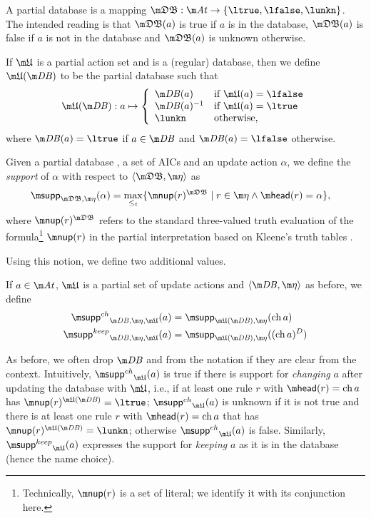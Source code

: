 A partial database is a mapping $\tdb: \atoms \to \{\ltrue,\lfalse,\lunkn\}$.
The intended reading is that $\tdb(a)$ is true if $a$ is in the database, $\tdb(a)$ is false if $a$ is not in the database and $\tdb(a)$ is unknown otherwise. 

If $\UUU$ is a partial action set and \db is a (regular) database, then we define $\UUU(\db)$ to be the partial database such that 
\[ \UUU(\db): a \mapsto \left \{\begin{array}{ll}
                                 \db(a) & \text{if }\UUU(a) = \lfalse\\
                                 \db(a)^{-1} & \text{if }\UUU(a) = \ltrue\\
                                 \lunkn & \text{otherwise,}
                                \end{array}\right.
                                \]
where $\db(a) = \ltrue$ if $a\in \db$ and $\db(a)=\lfalse$ otherwise. 



\begin{definition}\label{def:support}
Given a partial database \tdb, a set of AICs \aics and an update action $\alpha$,  we define the \emph{support} of $\alpha$ with respect to $\langle \tdb, \aics\rangle$ as 
\begin{align*}
 \supp_{\tdb,\aics}(\alpha) &= \max_{\leq_t}\{\nup(r)^{\tdb}\mid r\in \aics \land \head(r) = \alpha\},
\end{align*}
where $\nup(r)^{\tdb}$ refers to the standard three-valued truth evaluation of the formula\footnote{Technically, $\nup(r)$ is a set of literal; we identify it with its conjunction here.} $\nup(r)$ in the partial interpretation \tdb based on Kleene's truth tables \cite{Kleene38}.
\end{definition}

Using this notion, we define two additional values. 

\begin{definition}
If $a\in \atoms$, $\UUU$ is a partial set of update actions and $\langle \db, \aics\rangle$ as before, we define 
\begin{align*}
 \suppin_{\db,\aics,\UUU}(a) &= \supp_{\UUU(\db), \aics}(\change a)\\
  \suppout_{\db,\aics,\UUU}(a) &= \supp_{\UUU(\db), \aics}((\change a)^D)
\end{align*}
\end{definition}
As before, we often drop $\db$ and \aics from the notation if they are clear from the context. 
Intuitively, 
$\suppin_{\UUU}(a)$ is true if there is support for \emph{changing} $a$ after updating the database with $\UUU$, i.e., if at least one rule $r$ with $\head(r)=\change a$ has $\nup(r)^{\UUU(\db)} = \ltrue$;  
$\suppin_{\UUU}(a)$ is unknown if it is not true and there is at least one rule $r$ with $\head(r)=\change a$ that has $\nup(r)^{\UUU(\db)} = \lunkn$; 
otherwise $\suppin_{\UUU}(a)$ is false. 
Similarly, $\suppout_{\UUU}(a)$ expresses the support for \emph{keeping} $a$ as it is in the database (hence the name choice). 

